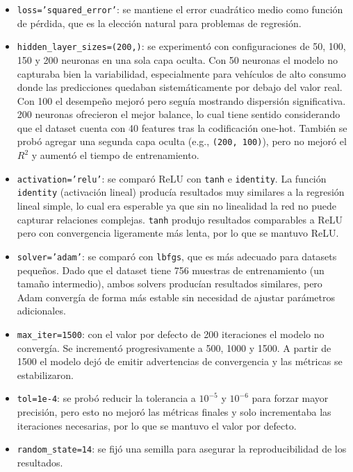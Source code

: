 \documentclass{article}
\begin{document}
\begin{itemize}
    \item \texttt{loss='squared\_error'}: se mantiene el error cuadrático medio como función de pérdida, que es la elección natural para problemas de regresión.
    \item \texttt{hidden\_layer\_sizes=(200,)}: se experimentó con configuraciones de 50, 100, 150 y 200 neuronas en una sola capa oculta. Con 50 neuronas el modelo no capturaba bien la variabilidad, especialmente para vehículos de alto consumo donde las predicciones quedaban sistemáticamente por debajo del valor real. Con 100 el desempeño mejoró pero seguía mostrando dispersión significativa. 200 neuronas ofrecieron el mejor balance, lo cual tiene sentido considerando que el dataset cuenta con 40 features tras la codificación one-hot. También se probó agregar una segunda capa oculta (e.g., \texttt{(200, 100)}), pero no mejoró el $R^2$ y aumentó el tiempo de entrenamiento.
    \item \texttt{activation='relu'}: se comparó ReLU con \texttt{tanh} e \texttt{identity}. La función \texttt{identity} (activación lineal) producía resultados muy similares a la regresión lineal simple, lo cual era esperable ya que sin no linealidad la red no puede capturar relaciones complejas. \texttt{tanh} produjo resultados comparables a ReLU pero con convergencia ligeramente más lenta, por lo que se mantuvo ReLU.
    \item \texttt{solver='adam'}: se comparó con \texttt{lbfgs}, que es más adecuado para datasets pequeños. Dado que el dataset tiene 756 muestras de entrenamiento (un tamaño intermedio), ambos solvers producían resultados similares, pero Adam convergía de forma más estable sin necesidad de ajustar parámetros adicionales.
    \item \texttt{max\_iter=1500}: con el valor por defecto de 200 iteraciones el modelo no convergía. Se incrementó progresivamente a 500, 1000 y 1500. A partir de 1500 el modelo dejó de emitir advertencias de convergencia y las métricas se estabilizaron.
    \item \texttt{tol=1e-4}: se probó reducir la tolerancia a $10^{-5}$ y $10^{-6}$ para forzar mayor precisión, pero esto no mejoró las métricas finales y solo incrementaba las iteraciones necesarias, por lo que se mantuvo el valor por defecto.
    \item \texttt{random\_state=14}: se fijó una semilla para asegurar la reproducibilidad de los resultados.
\end{itemize}
\end{document}
